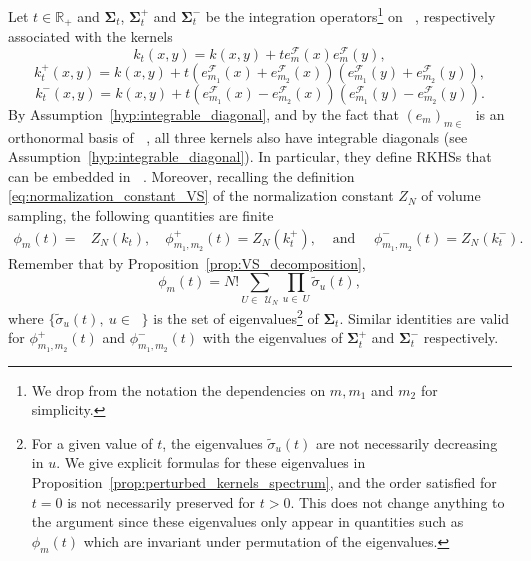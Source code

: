 \documentclass[twoside,11pt]{book}
\DeclareMathOperator{\F}{\mathcal{F}}
\DeclareMathOperator{\X}{\mathcal{X}}
\DeclareMathOperator{\Ltwo}{\mathbb{L}_{2}(\mathrm{d} \omega)}
\DeclareMathOperator{\Ns}{\mathbb{N}^{*}}
\def\UN{\:\mathcal{U}_N}
\begin{document}
Let $t\in\mathbb{R}_{+}$ and $\bm{\Sigma}_{t}$, $\bm{\Sigma}_{t}^{+}$ and $\bm{\Sigma}_{t}^{-}$ be the integration operators\footnote{We drop from the notation the dependencies on $m,m_{1}$ and $m_{2}$ for simplicity.} on $\Ltwo$, respectively associated with the kernels
\begin{equation}\label{eq:k_t}
k_{t}(x,y) = k(x,y) + t e_{m}^{\F}(x) e_{m}^{\F}(y),
\end{equation}
\begin{equation}\label{eq:k_t_plus}
k_{t}^{+}(x,y) = k(x,y)
+ t \left( e_{m_{1}}^{\F}(x) + e_{m_{2}}^{\F}(x) \right) \left( e_{m_{1}}^{\F}(y) + e_{m_{2}}^{\F}(y) \right),
\end{equation}
\begin{equation}\label{eq:k_t_minus}
k_{t}^{-}(x,y) = k(x,y) + t \left( e_{m_{1}}^{\F}(x) - e_{m_{2}}^{\F}(x) \right) \left( e_{m_{1}}^{\F}(y) - e_{m_{2}}^{\F}(y) \right).
\end{equation}
By Assumption~\ref{hyp:integrable_diagonal}, and by the fact that $(e_{m})_{m \in \Ns}$ is an orthonormal basis of $\Ltwo$, all three kernels also have integrable diagonals (see Assumption~\ref{hyp:integrable_diagonal}).
In particular, they define RKHSs that can be embedded in $\Ltwo$. Moreover, recalling the definition \eqref{eq:normalization_constant_VS} of the normalization constant $Z_{N}$ of volume sampling, the following quantities are finite
\begin{align}
\phi_{m}(t) = & Z_{N}(k_{t}) , \quad\phi_{m_{1},m_{2}}^{+}(t) = Z_{N}(k_{t}^{+}),&\text{ and }\quad \phi_{m_{1},m_{2}}^{-}(t) = Z_{N}(k_{t}^{-}).
\end{align}
Remember that by Proposition~\ref{prop:VS_decomposition},
\begin{equation}\label{eq:Z_kt}
\phi_{m}(t) = N! \sum\limits_{U \in \: \UN} \prod\limits_{u \in \: U} \tilde{\sigma}_{u}(t),
\end{equation}
where $\displaystyle \{\tilde{\sigma}_{u}(t), \: u \in \Ns\}$ is the set of eigenvalues\footnote{For a given value of $t$, the eigenvalues $\tilde{\sigma}_{u}(t)$ are not necessarily decreasing in $u$. We give explicit formulas for these eigenvalues in Proposition~\ref{prop:perturbed_kernels_spectrum}, and the order satisfied for $t=0$ is not necessarily preserved for $t>0$. This does not change anything to the argument since these eigenvalues only appear in quantities such as $\phi_{m}(t)$ which are invariant under permutation of the eigenvalues.} of $\bm{\Sigma}_{t}$. Similar identities are valid for $\phi_{m_{1},m_{2}}^{+}(t)$ and $\phi_{m_{1},m_{2}}^{-}(t)$ with the eigenvalues of $\bm{\Sigma}_{t}^{+}$ and $\bm{\Sigma}_{t}^{-}$ respectively.
\end{document}
